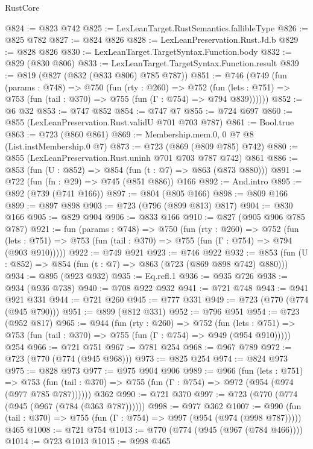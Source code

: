 \begin{lexlean}{RustCore}
\begin{coremodule}
@824 := @823 @742
@825 := LexLeanTarget.RustSemantics.fallibleType
@826 := @825 @782
@827 := @824 @826
@828 := LexLeanPreservation.Rust.Jd.b
@829 := @828 @826
@830 := LexLeanTarget.TargetSyntax.Function.body
@832 := @829 (@830 @806)
@833 := LexLeanTarget.TargetSyntax.Function.result
@839 := @819 (@827 (@832 (@833 @806) @785 @787))
@851 := @746
    (@749
      (fun (params : @748) =>
      @750
        (fun (rty : @260) =>
        @752
          (fun (lets : @751) => @753 (fun (tail : @370) => @755 (fun (Γ : @754) => @794 @839))))))
@852 := @6 @32
@853 := @747 @852
@854 := @747 @7
@855 := @724 @697
@860 := @855 (LexLeanPreservation.Rust.validU @701 @703 @787)
@861 := Bool.true
@863 := @723 (@860 @861)
@869 := Membership.mem.{0, 0} @7 @8 (List.instMembership.{0} @7)
@873 := @723 (@869 (@809 @785) @742)
@880 := @855 (LexLeanPreservation.Rust.uninh @701 @703 @787 @742) @861
@886 := @853 (fun (U : @852) => @854 (fun (t : @7) => @863 (@873 @880)))
@891 := @722 (fun (fn : @29) => @745 (@851 @886)) @166
@892 := And.intro
@895 := @892 (@739 (@741 @166))
@897 := @804 (@805 @166)
@898 := @809 @166
@899 := @897 @898
@903 := @723 (@796 (@899 @813) @817)
@904 := @830 @166
@905 := @829 @904
@906 := @833 @166
@910 := @827 (@905 @906 @785 @787)
@921 := fun (params : @748) =>
  @750
    (fun (rty : @260) =>
    @752
      (fun (lets : @751) => @753 (fun (tail : @370) => @755 (fun (Γ : @754) => @794 (@903 @910)))))
@922 := @749 @921
@923 := @746 @922
@932 := @853 (fun (U : @852) => @854 (fun (t : @7) => @863 (@723 (@869 @898 @742) @880)))
@934 := @895 (@923 @932)
@935 := Eq.refl.{1}
@936 := @935 @726
@938 := @934 (@936 @738)
@940 := @708 @922 @932
@941 := @721 @748
@943 := @941 @921 @331
@944 := @721 @260
@945 := @777 @331
@949 := @723 (@770 (@774 (@945 @790)))
@951 := @899 (@812 @331)
@952 := @796 @951
@954 := @723 (@952 @817)
@965 := @944
    (fun (rty : @260) =>
    @752
      (fun (lets : @751) => @753 (fun (tail : @370) => @755 (fun (Γ : @754) => @949 (@954 @910)))))
    @254
@966 := @721 @751
@967 := @781 @254
@968 := @967 @789
@972 := @723 (@770 (@774 (@945 @968)))
@973 := @825 @254
@974 := @824 @973
@975 := @828 @973
@977 := @975 @904 @906
@989 := @966
    (fun (lets : @751) =>
    @753 (fun (tail : @370) => @755 (fun (Γ : @754) => @972 (@954 (@974 (@977 @785 @787))))))
    @362
@990 := @721 @370
@997 := @723 (@770 (@774 (@945 (@967 (@784 (@363 @787))))))
@998 := @977 @362
@1007 := @990 (fun (tail : @370) => @755 (fun (Γ : @754) => @997 (@954 (@974 (@998 @787))))) @465
@1008 := @721 @754
@1013 := @770 (@774 (@945 (@967 (@784 @466))))
@1014 := @723 @1013
@1015 := @998 @465

\end{coremodule}
\end{lexlean}
